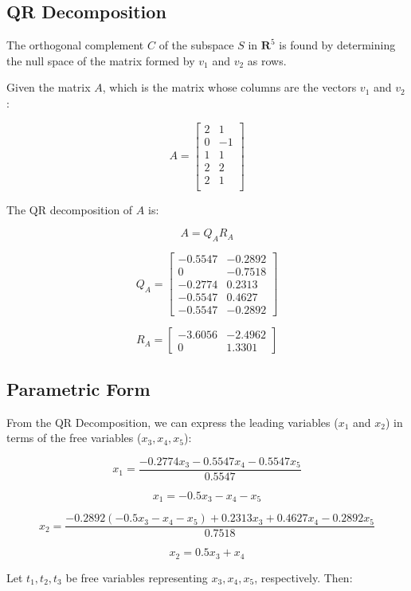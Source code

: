 \documentclass{article}
\begin{document}
\subsection{QR Decomposition}

The orthogonal complement \( C \) of the subspace \( S \) in \( \mathbf{R}^5 \) is found by determining the null space of the matrix formed by \( v_1 \) and \( v_2 \) as rows.

Given the matrix \( A \), which is the matrix whose columns are the vectors $v_1$ and $v_2$:

\[
A = \begin{bmatrix}
    2 & 1 \\
    0 & -1 \\ 
    1 & 1 \\
    2 & 2 \\ 
    2 & 1 \\
\end{bmatrix}
\]

The QR decomposition of \( A \) is:

\[
A = Q_{A} R_{A}
\]

\[
Q_{A} = \begin{bmatrix}
    -0.5547 & -0.2892 \\
    0 & -0.7518 \\
    -0.2774 & 0.2313 \\
    -0.5547 & 0.4627 \\
    -0.5547 & -0.2892
\end{bmatrix}
\]

\[
R_{A} = \begin{bmatrix}
    -3.6056 & -2.4962 \\
    0 & 1.3301
\end{bmatrix}
\]

\subsection{Parametric Form}
From the QR Decomposition, we can express the leading variables (\( x_1 \) and \( x_2 \)) in terms of the free variables (\( x_3, x_4, x_5 \)):

\[
x_1 = \frac{-0.2774x_3 -0.5547x_4 -0.5547x_5}{0.5547}
\]

\[
x_1 = -0.5x_3 -x_4 -x_5
\]

\[
x_2 = \frac{-0.2892(-0.5x_3 -x_4 -x_5) + 0.2313x_3 + 0.4627x_4 - 0.2892x_5}{0.7518}
\]

\[
x_2 = 0.5x_3 + x_4
\]

Let \( t_1, t_2, t_3 \) be free variables representing \( x_3, x_4, x_5 \), respectively. Then:
\end{document}
